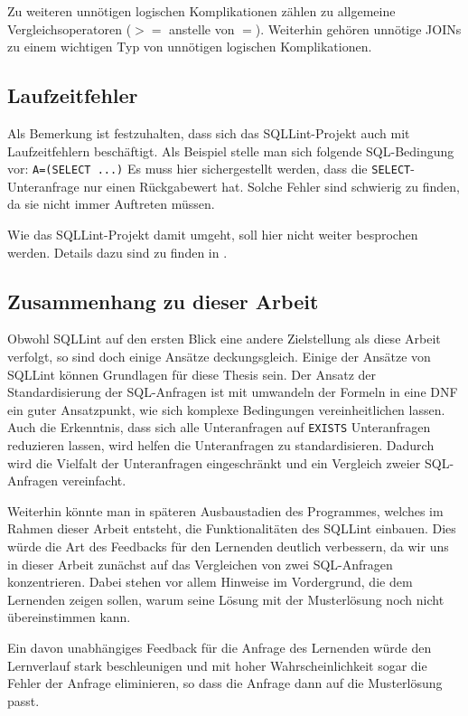 Zu weiteren unnötigen logischen Komplikationen zählen zu allgemeine Vergleichsoperatoren ($>=$ anstelle von $=$). Weiterhin gehören unnötige JOINs zu einem wichtigen Typ von unnötigen logischen Komplikationen.

\subsection{Laufzeitfehler}

Als Bemerkung ist festzuhalten, dass sich das SQLLint-Projekt auch mit Laufzeitfehlern beschäftigt. Als Beispiel stelle man sich folgende SQL-Bedingung vor: \verb|A=(SELECT ...)| Es muss hier sichergestellt werden, dass die \verb|SELECT|-Unteranfrage nur einen Rückgabewert hat. Solche Fehler sind schwierig zu finden, da sie nicht immer Auftreten müssen. 

Wie das SQLLint-Projekt damit umgeht, soll hier nicht weiter besprochen werden. Details dazu sind zu finden in \cite{brass2}. 

\subsection*{Zusammenhang zu dieser Arbeit}

Obwohl SQLLint auf den ersten Blick eine andere Zielstellung als diese Arbeit verfolgt, so sind doch einige Ansätze deckungsgleich. Einige der Ansätze von SQLLint können Grundlagen für diese Thesis sein. Der Ansatz der Standardisierung der SQL-Anfragen ist mit umwandeln der Formeln in eine DNF ein guter Ansatzpunkt, wie sich komplexe Bedingungen vereinheitlichen lassen. Auch die Erkenntnis, dass sich alle Unteranfragen auf \verb|EXISTS| Unteranfragen reduzieren lassen, wird helfen die Unteranfragen zu standardisieren. Dadurch wird die Vielfalt der Unteranfragen eingeschränkt und ein Vergleich zweier SQL-Anfragen vereinfacht.

Weiterhin könnte man in späteren Ausbaustadien des Programmes, welches im Rahmen dieser Arbeit entsteht, die Funktionalitäten des SQLLint einbauen. Dies würde die Art des Feedbacks für den Lernenden deutlich verbessern, da wir uns in dieser Arbeit zunächst auf das Vergleichen von zwei SQL-Anfragen konzentrieren. Dabei stehen vor allem Hinweise im Vordergrund, die dem Lernenden zeigen sollen, warum seine Lösung mit der Musterlösung noch nicht übereinstimmen kann.

Ein davon unabhängiges Feedback für die Anfrage des Lernenden würde den Lernverlauf stark beschleunigen und mit hoher Wahrscheinlichkeit sogar die Fehler der Anfrage eliminieren, so dass die Anfrage dann auf die Musterlösung passt.